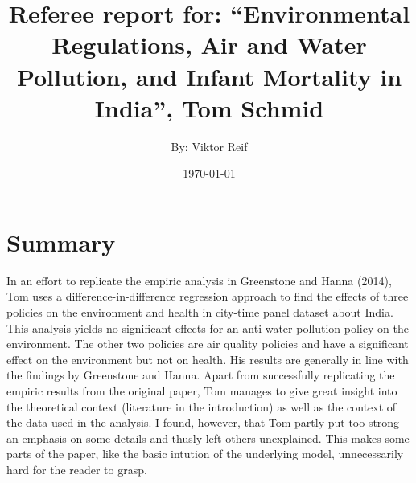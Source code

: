 \documentclass[11pt]{article}
\title{Referee report for: “Environmental Regulations, Air and Water
	Pollution, and Infant Mortality in India”, Tom Schmid}
\author{By: Viktor Reif}
\date{\today}
\begin{document}
	\maketitle
	
	


\section{Summary}
In an effort to replicate the empiric analysis in Greenstone and Hanna (2014), Tom uses a difference-in-difference regression approach to find the effects of three policies on the environment and health in city-time panel dataset about India. This analysis yields no significant effects for an anti water-pollution policy on the environment. The other two policies are air quality policies and have a significant effect on the environment but not on health. His results are generally in line with the findings by Greenstone and Hanna.
\newline Apart from successfully replicating the empiric results from the original paper, Tom manages to give great insight into the theoretical context (literature in the introduction) as well as the context of the data used in the analysis. I found, however, that Tom partly put too strong an emphasis on some details and thusly left others unexplained. This makes some parts of the paper, like the basic intution of the underlying model, unnecessarily hard for the reader to grasp.

\end{document}
